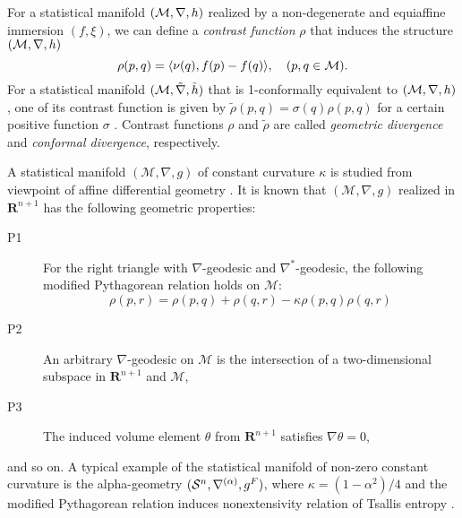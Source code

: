 \documentclass{llncs}
\begin{document}

For a statistical manifold $({\cal M}, \nabla,h)$ realized by 
a non-degenerate and equiaffine immersion $(f,\xi)$, 
we can define a {\em contrast function} $\rho$
that induces the structure $({\cal M}, \nabla,h)$
\[
	\rho(p,q)=\langle \nu(q), f(p)-f(q) \rangle, \quad (p,q \in {\cal M}).
\]
For a statistical manifold $({\cal M},\tilde \nabla, \tilde h)$ that is 
1-conformally equivalent to $({\cal M}, \nabla,h)$, one of 
its contrast function is given by $\tilde \rho(p,q)=\sigma(q) \rho(p,q)$ 
for a certain positive function $\sigma$ \cite{Kurose94}.
Contrast functions $\rho$ and $\tilde \rho$ are called 
{\em geometric divergence} and {\em conformal divergence}, respectively.

A statistical manifold $(\mathcal{M}, \nabla, g)$ of constant
curvature $\kappa$ is studied from viewpoint of affine differential geometry 
\cite{Kurose94}.
It is known that $(\mathcal{M},\nabla,g)$ realized in $\mathbf{R}^{n+1}$ 
has the following geometric properties:
\begin{description}
 \item[P1] For the right triangle with $\nabla$-geodesic and 
$\nabla^*$-geodesic, the following modified Pythagorean relation 
holds on $\mathcal{M}$:
\[
	\rho(p,r)=\rho(p,q)+\rho(q,r)-\kappa \rho(p,q)\rho(q,r)
\]
 \item[P2] An arbitrary $\nabla$-geodesic on $\mathcal{M}$ is the intersection of a two-dimensional subspace in $\mathbf{R}^{n+1}$ and $\mathcal{M}$,   
 \item[P3] The induced volume element $\theta$ from $\mathbf{R}^{n+1}$
	   satisfies $\nabla \theta =0$, 
\end{description}
and so on. 
A typical example of the statistical manifold of non-zero constant curvature 
is the alpha-geometry $({\cal S}^n,\nabla^{(\alpha)},g^F)$, where 
$\kappa=(1-\alpha^2)/4$ and 
the modified Pythagorean relation induces nonextensivity relation of
Tsallis entropy \cite{Ohara07}. 


\end{document}
